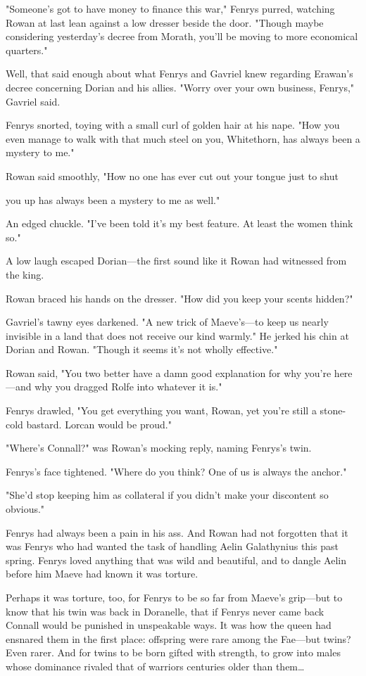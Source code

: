 "Someone's got to have money to finance this war," Fenrys purred, watching Rowan at last lean against a low dresser beside the door. "Though maybe considering yesterday's decree from Morath, you'll be moving to more  economical quarters."

Well, that said enough about what Fenrys and Gavriel knew regarding Erawan's decree concerning Dorian and his allies. "Worry over your own business, Fenrys," Gavriel said.

Fenrys snorted, toying with a small curl of golden hair at his nape. "How you even manage to walk with that much steel on you, Whitethorn, has always been a mystery to me."

Rowan said smoothly, "How no one has ever cut out your tongue just to shut

you up has always been a mystery to me as well."

An edged chuckle. "I've been told it's my best feature. At least the women think so."

A low laugh escaped Dorian---the first sound like it Rowan had witnessed from the king.

Rowan braced his hands on the dresser. "How did you keep your scents hidden?"

Gavriel's tawny eyes darkened. "A new trick of Maeve's---to keep us nearly invisible in a land that does not receive our kind warmly." He jerked his chin at Dorian and Rowan. "Though it seems it's not wholly effective."

Rowan said, "You two better have a damn good explanation for why you're here---and why you dragged Rolfe into whatever it is."

Fenrys drawled, "You get everything you want, Rowan, yet you're still a stone-cold bastard. Lorcan would be proud."

"Where's Connall?" was Rowan's mocking reply, naming Fenrys's twin.

Fenrys's face tightened. "Where do you think? One of us is always the anchor."

"She'd stop keeping him as collateral if you didn't make your discontent so obvious."

Fenrys had always been a pain in his ass. And Rowan had not forgotten that it was Fenrys who had wanted the task of handling Aelin Galathynius this past spring. Fenrys loved anything that was wild and beautiful, and to dangle Aelin before him  Maeve had known it was torture.

Perhaps it was torture, too, for Fenrys to be so far from Maeve's grip---but to know that his twin was back in Doranelle, that if Fenrys never came back  Connall would be punished in unspeakable ways. It was how the queen had ensnared them in the first place: offspring were rare among the Fae---but twins? Even rarer. And for twins to be born gifted with strength, to grow into males whose dominance rivaled that of warriors centuries older than them\ldots{}

